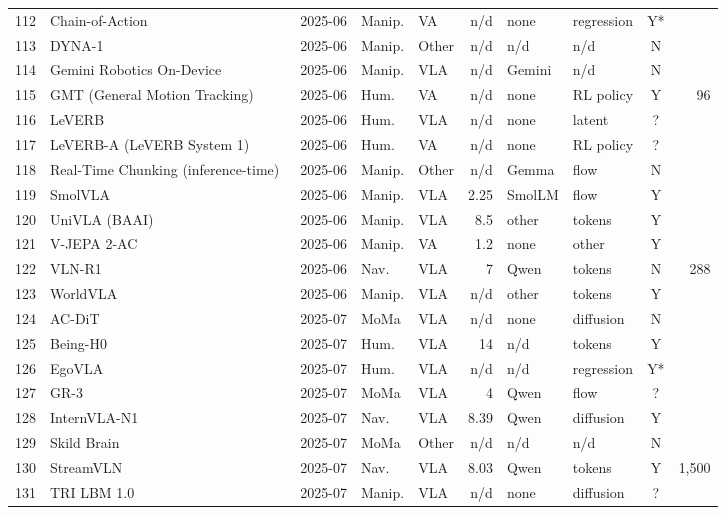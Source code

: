 \begin{longtable}{@{}r p{3.55cm} l l l r l l c r@{}}
112 & Chain-of-Action~\cite{ax250609990} & 2025-06 & Manip. & VA & n/d & none & regression & Y* & \\
113 & DYNA-1~\cite{web-dyna-1} & 2025-06 & Manip. & Other & n/d & n/d & n/d & N & \\
114 & Gemini Robotics On-Device~\cite{web-gemini-robotics-on-device} & 2025-06 & Manip. & VLA & n/d & Gemini & n/d & N & \\
115 & GMT (General Motion Tracking)~\cite{ax250614770} & 2025-06 & Hum. & VA & n/d & none & RL policy & Y & 96\\
116 & LeVERB~\cite{ax250613751} & 2025-06 & Hum. & VLA & n/d & none & latent & ? & \\
117 & LeVERB-A (LeVERB System 1)~\cite{ax250613751} & 2025-06 & Hum. & VA & n/d & none & RL policy & ? & \\
118 & Real-Time Chunking (inference-time)~\cite{ax250607339} & 2025-06 & Manip. & Other & n/d & Gemma & flow & N & \\
119 & SmolVLA~\cite{ax250601844} & 2025-06 & Manip. & VLA & 2.25 & SmolLM & flow & Y & \\
120 & UniVLA (BAAI)~\cite{ax250619850} & 2025-06 & Manip. & VLA & 8.5 & other & tokens & Y & \\
121 & V-JEPA 2-AC~\cite{ax250609985} & 2025-06 & Manip. & VA & 1.2 & none & other & Y & \\
122 & VLN-R1~\cite{ax250617221} & 2025-06 & Nav. & VLA & 7 & Qwen & tokens & N & 288\\
123 & WorldVLA~\cite{ax250621539} & 2025-06 & Manip. & VLA & n/d & other & tokens & Y & \\
124 & AC-DiT~\cite{ax250701961} & 2025-07 & MoMa & VLA & n/d & none & diffusion & N & \\
125 & Being-H0~\cite{ax250715597} & 2025-07 & Hum. & VLA & 14 & n/d & tokens & Y & \\
126 & EgoVLA~\cite{ax250712440} & 2025-07 & Hum. & VLA & n/d & n/d & regression & Y* & \\
127 & GR-3~\cite{ax250715493} & 2025-07 & MoMa & VLA & 4 & Qwen & flow & ? & \\
128 & InternVLA-N1~\cite{web-internvla-n1} & 2025-07 & Nav. & VLA & 8.39 & Qwen & diffusion & Y & \\
129 & Skild Brain~\cite{web-skild-brain} & 2025-07 & MoMa & Other & n/d & n/d & n/d & N & \\
130 & StreamVLN~\cite{ax250705240} & 2025-07 & Nav. & VLA & 8.03 & Qwen & tokens & Y & 1,500\\
131 & TRI LBM 1.0~\cite{ax250705331} & 2025-07 & Manip. & VLA & n/d & none & diffusion & ? & \\

\end{longtable}
